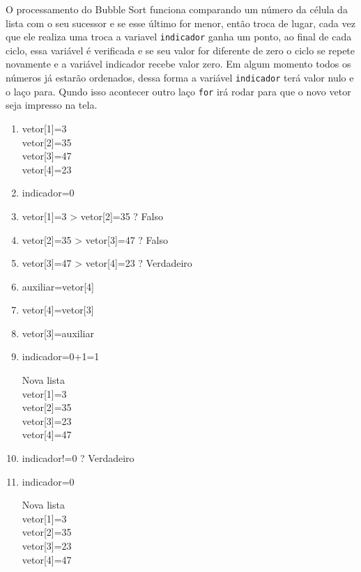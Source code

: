 \documentclass[11pts]{book}
\begin{document}
O processamento do Bubble Sort funciona comparando um número da célula da lista com o seu sucessor e se esse último for menor, então troca de lugar, cada vez que ele realiza uma troca a variavel \texttt{indicador} ganha um ponto, ao final de cada ciclo, essa variável é verificada e se seu valor for diferente de zero o ciclo se repete novamente e a variável indicador recebe valor zero. Em algum momento todos os números já estarão ordenados, dessa forma a variável \texttt{indicador} terá valor nulo e o laço para. Qundo isso acontecer outro laço \texttt{for} irá rodar para que o novo vetor seja impresso na tela.\\

\begin{enumerate}


\item vetor[1]=3 \\
vetor[2]=35 \\
vetor[3]=47 \\
vetor[4]=23 \\

\item indicador=0

\item vetor[1]=3 > vetor[2]=35 ? Falso

\item vetor[2]=35 > vetor[3]=47 ? Falso

\item vetor[3]=47 > vetor[4]=23 ? Verdadeiro 

\item auxiliar=vetor[4]

\item vetor[4]=vetor[3]

\item vetor[3]=auxiliar

\item  indicador=0+1=1

 Nova lista \\
vetor[1]=3 \\
vetor[2]=35 \\
vetor[3]=23 \\
vetor[4]=47 \\


\item indicador!=0  ? Verdadeiro 

\item indicador=0

 Nova lista \\
vetor[1]=3 \\
vetor[2]=35 \\
vetor[3]=23 \\
vetor[4]=47 \\


\end{enumerate}
\end{document}
